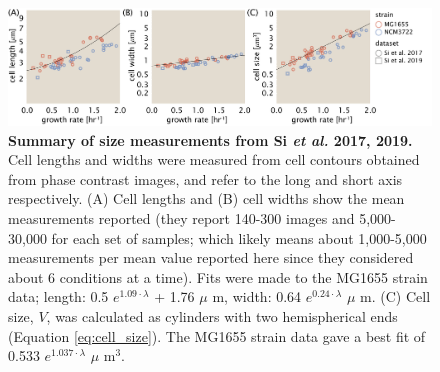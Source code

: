 \begin{figure}
		\centering
    \includegraphics[width=1.0\textwidth]{SI_figs/final_cell_size_Si.pdf}
  \caption{\textbf{Summary of size measurements from Si \textit{et al.} 2017, 2019.}
	 	 Cell lengths and widths were measured from cell contours obtained from
	 	 phase contrast images, and refer to the long and short axis respectively.
	 	 (A) Cell lengths and (B) cell widths show the mean measurements reported
	 	 (they report 140-300 images and 5,000-30,000 for each set of samples;
	 	 which likely means about 1,000-5,000 measurements per mean value reported
	 	 here since they considered about 6 conditions at a time). Fits were made
	 	 to the  MG1655 strain data; length: 0.5 $e^{1.09 \cdot \lambda}$ + 1.76
	 	 $\mu$ m, width:  0.64 $e^{0.24 \cdot \lambda}$ $\mu$ m. (C) Cell size,
	 	 $V$, was calculated as cylinders with two hemispherical ends (Equation \ref{eq:cell_size}). The MG1655 strain data gave a best fit of 0.533 $e^{1.037
	 	 \cdot \lambda}$ $\mu$ m$^3$.}
  \label{fig:final_size_data_Si}
\end{figure}
